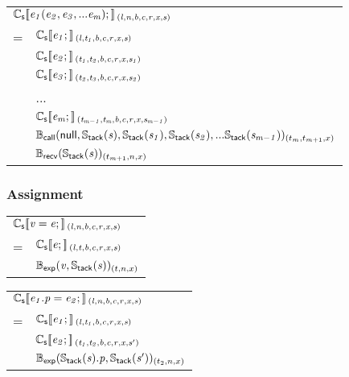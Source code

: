 \documentclass[a4j]{jsarticle}
\newcommand{\lb}{[\![}				%
\newcommand{\rb}{]\!]}				%
\newcommand{\db}[1]{\lb#1\rb}			%
\newcommand{\den}[2]{{#1}\db{#2}\,}
\newcommand{\defC}[3]{\den{#1}{\sf #2}_{\it #3}}
\newcommand{\Cs}{\defC{\mathbb{C}_{\sf s}}}
\newcommand{\Stack}[1]{\mathbb{S}_{\sf tack}(#1)}
\newcommand{\defB}[3]{{#1}({\sf #2})_{#3}}
\newcommand{\Bexp}{\defB{\mathbb{B}_{\sf exp}}}
\newcommand{\Bcall}{\defB{\mathbb{B}_{\sf call}}}
\newcommand{\Brecv}{\defB{\mathbb{B}_{\sf recv}}}
\newcommand{\var}[1]{{\it #1}}
\begin{document}
\vspace{1em}

\begin{tabular}{ll}
	\multicolumn{2}{l}{
		$ \Cs{ \var{e_1} ( \var{e_2}, \var{e_3}, ... \var{e_m} ); }{(l, n, b, c, r, x, s)} $
	}  \\
	=  &  $ \Cs{ \var{e_1}; }{(l  , t_1, b, c, r, x, s)}      $  \\
	   &  $ \Cs{ \var{e_2}; }{(t_1, t_2, b, c, r, x, s_1)}    $  \\
	   &  $ \Cs{ \var{e_3}; }{(t_2, t_3, b, c, r, x, s_2)}    $  \\
	   &  ...  \\
	   &  $ \Cs{ \var{e_m}; }{(t_{m-1}, t_m, b, c, r, x, s_{m-1})}    $  \\
	   &  $ \Bcall{ null, \Stack{\var{s}}, \Stack{\var{s_1}}, \Stack{\var{s_2}}, ... \Stack{\var{s_{m-1}}} }{(t_m, t_{m+1}, x)}    $  \\
	   &  $ \Brecv{ \Stack{\var{s}} }{(t_{m+1}, n, x)}    $  \\
\end{tabular}


\subsubsection{Assignment}

\begin{tabular}{ll}
	\multicolumn{2}{l}{
		$ \Cs{ \var{v} = \var{e}; }{(l, n, b, c, r, x, s)} $
	}  \\
	=   &  $ \Cs{ \var{e}; }{(l, t, b, c, r, x, s)} $  \\
	    &  $ \Bexp{ \var{v}, \Stack{\var{s}} }{(t, n, x)}      $
\end{tabular}

\vspace{1em}

\begin{tabular}{ll}
	\multicolumn{2}{l}{
		$ \Cs{ \var{e_1}.\var{p} = \var{e_2}; }{(l, n, b, c, r, x, s)} $
	}  \\
	=   &  $ \Cs{ \var{e_1}; }{(l  , t_1, b, c, r, x, s)}                    $  \\
	    &  $ \Cs{ \var{e_2}; }{(t_1, t_2, b, c, r, x, s')}                   $  \\
	    &  $ \Bexp{ \Stack{\var{s}}.\var{p}, \Stack{\var{s'}} }{(t_2, n, x)} $
\end{tabular}

\vspace{1em}
\end{document}
